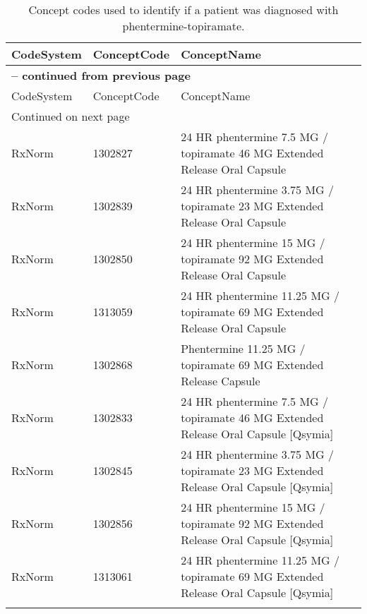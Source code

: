 \begin{longtable}{p{}p{}p{}}
\caption{Concept codes used to identify if a patient was diagnosed with phentermine-topiramate.} \\ 
 CodeSystem & ConceptCode & ConceptName \\ 
  \hline 
\endfirsthead 
\multicolumn{3}{p{\textwidth}}{{ \bfseries \tablename \thetable{} -- continued from previous page}} \\ 
\hline CodeSystem & ConceptCode & ConceptName \\ \hline 
\endhead 
\hline \multicolumn{3}{p{\textwidth}}{{Continued on next page}} \\ \hline 
\endfoot 
\hline 
\endlastfoot 
 \hline
RxNorm & 1302827 & 24 HR phentermine 7.5 MG / topiramate 46 MG Extended Release Oral Capsule \\ 
  RxNorm & 1302839 & 24 HR phentermine 3.75 MG / topiramate 23 MG Extended Release Oral Capsule \\ 
  RxNorm & 1302850 & 24 HR phentermine 15 MG / topiramate 92 MG Extended Release Oral Capsule \\ 
  RxNorm & 1313059 & 24 HR phentermine 11.25 MG / topiramate 69 MG Extended Release Oral Capsule \\ 
  RxNorm & 1302868 & Phentermine 11.25 MG / topiramate 69 MG Extended Release Capsule \\ 
  RxNorm & 1302833 & 24 HR phentermine 7.5 MG / topiramate 46 MG Extended Release Oral Capsule [Qsymia] \\ 
  RxNorm & 1302845 & 24 HR phentermine 3.75 MG / topiramate 23 MG Extended Release Oral Capsule [Qsymia] \\ 
  RxNorm & 1302856 & 24 HR phentermine 15 MG / topiramate 92 MG Extended Release Oral Capsule [Qsymia] \\ 
  RxNorm & 1313061 & 24 HR phentermine 11.25 MG / topiramate 69 MG Extended Release Oral Capsule [Qsymia] \\ 
  \hline
\label{tab:codes_phentermine-topiramate}
\end{longtable}
